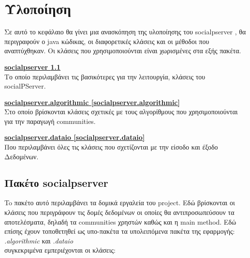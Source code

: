 
\chapter{Υλοποίηση} %

\label{Υλοποίηση} %

\noindent
Σε αυτό το κεφάλαιο θα γίνει μια ανασκόπηση της υλοποίησης του  socialpserver , θα περιγραφούν ο java κώδικας, οι διαφορετικές κλάσεις και οι μέθοδοι που αναπτύχθηκαν.
Οι κλάσεις που χρησιμοποιούνται είναι χωρισμένες στα εξής πακέτα.


\begin{description}
\item \textbf{  \hyperref[socialpserver]{ socialpserver   \ref*{socialpserver} } }  \hfill \\
Το οποίο περιλαμβάνει τις βασικότερες για την λειτουργία, κλάσεις του socialPServer.
\item \textbf{ \hyperref[socialpserver.algorithmic]{ socialpserver.algorithmic   \ref*{socialpserver.algorithmic} }  }  \hfill \\
Στο οποίο βρίσκονται κλάσεις σχετικές με τους αλγορίθμους που χρησιμοποιούνται για την παραγωγή communities.
\item \textbf{  \hyperref[socialpserver.dataio]{ socialpserver.dataio   \ref*{socialpserver.dataio} }  }   \hfill \\
Που περιλαμβάνει όλες τις κλάσεις που σχετίζονται με την είσοδο και έξοδο Δεδομένων. 
\end{description}


\section{Πακέτο socialpserver}
\label{socialpserver}
\noindent
To πακέτο αυτό περιλαμβάνει τα δομικά εργαλεία του project. Εδώ βρίσκονται οι κλάσεις που περιγράφουν τις δομές δεδομένων οι οποίες θα αντιπροσωπεύσουν τα αποτελέσματα,
δηλαδή τα communities χρηστών καθώς και η main method. Εδώ επίσης έχουν τοποθετηθεί ως υπο-πακέτα τα υπολειπόμενα πακέτα της εφαρμογής: \emph{.algorithmic} και \emph{.dataio} \\
συγκεκριμένα εμπεριέχονται οι κλάσεις:

